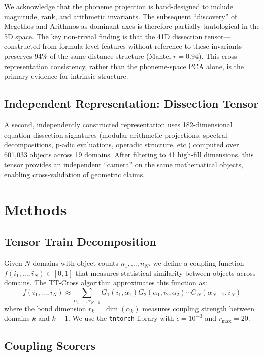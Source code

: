 \documentclass[11pt,a4paper]{article}
\begin{document}
We acknowledge that the phoneme projection is hand-designed to include magnitude, rank, and arithmetic invariants. The subsequent ``discovery'' of Megethos and Arithmos as dominant axes is therefore partially tautological in the 5D space. The key non-trivial finding is that the 41D dissection tensor---constructed from formula-level features without reference to these invariants---preserves 94\% of the same distance structure (Mantel $r = 0.94$). This cross-representation consistency, rather than the phoneme-space PCA alone, is the primary evidence for intrinsic structure.

\subsection{Independent Representation: Dissection Tensor}

A second, independently constructed representation uses 182-dimensional equation dissection signatures (modular arithmetic projections, spectral decompositions, p-adic evaluations, operadic structure, etc.) computed over 601,033 objects across 19 domains. After filtering to 41 high-fill dimensions, this tensor provides an independent ``camera'' on the same mathematical objects, enabling cross-validation of geometric claims.

\section{Methods}

\subsection{Tensor Train Decomposition}

Given $N$ domains with object counts $n_1, \ldots, n_N$, we define a coupling function $f(i_1, \ldots, i_N) \in [0,1]$ that measures statistical similarity between objects across domains. The TT-Cross algorithm \cite{oseledets2010} approximates this function as:
\[
f(i_1, \ldots, i_N) \approx \sum_{\alpha_1,\ldots,\alpha_{N-1}} G_1(i_1, \alpha_1) G_2(\alpha_1, i_2, \alpha_2) \cdots G_N(\alpha_{N-1}, i_N)
\]
where the bond dimension $r_k = \dim(\alpha_k)$ measures coupling strength between domains $k$ and $k+1$. We use the \texttt{tntorch} library \cite{tntorch} with $\epsilon = 10^{-3}$ and $r_{\max} = 20$.

\subsection{Coupling Scorers}
\end{document}
